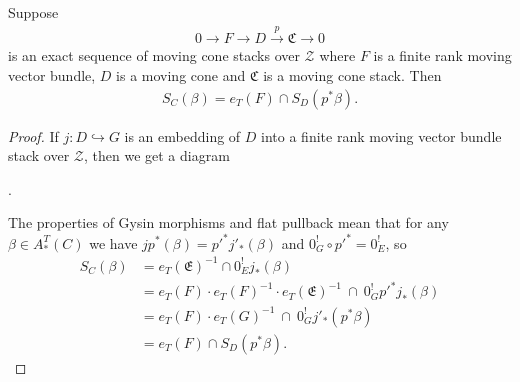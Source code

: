 \begin{lemma}\label{rl-0013}\label{lem:torsor-lemma}
  Suppose
  \begin{align*}
    0 \to F\to D\xrightarrow {p} \mathfrak C\to 0
  \end{align*}
  is an exact sequence of moving cone stacks over \(\mathcal Z\) where \(F\) is a finite rank moving vector bundle, \(D\) is a moving cone and \(\mathfrak C\) is a moving cone stack. Then
  \begin{align*}
    S_C(\beta) = e_T(F)\cap S_D(p^*\beta).
  \end{align*}
\end{lemma}
\begin{proof}
  If \(j:D\hookrightarrow G\) is an embedding of \(D\) into a finite rank moving vector bundle stack over \(\mathcal Z\), then we get a diagram
  \begin{center}
    .
  \end{center}
  The properties of Gysin morphisms and flat pullback mean that for any \(\beta\in A^T_*(C)\) we have \(jp^*(\beta) = p'^*j'_*(\beta)\) and \(0^!_G\circ p'^* = 0^!_E\), so
  \begin{align*}
    S_C(\beta) &= e_T(\mathfrak E)^{-1} \cap 0^!_{E}j_*(\beta) \\
           &= e_T(F)\cdot e_T(F)^{-1}\cdot e_T(\mathfrak E)^{-1}~\cap~ 0^!_Gp'^*j_*(\beta) \\
           &= e_T(F)\cdot e_T(G)^{-1} ~\cap~ 0^!_Gj'_*(p^*\beta) \\
    &= e_T(F)\cap S_D(p^*\beta).
  \end{align*}
\end{proof}
